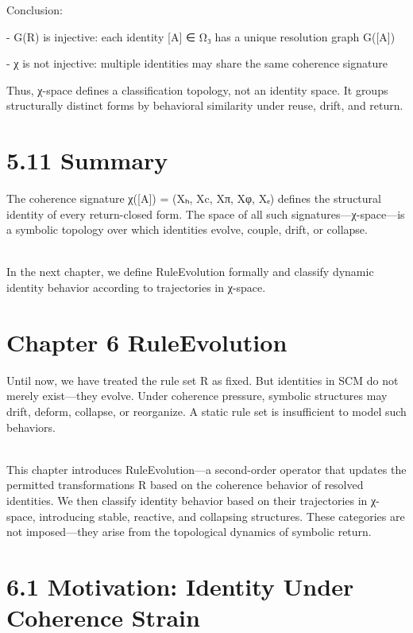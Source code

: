 Conclusion:

- G(R) is injective: each identity {[}A{]} ∈ Ω₃ has a unique resolution
graph G({[}A{]})

- χ is not injective: multiple identities may share the same coherence
signature

Thus, χ-space defines a classification topology, not an identity space.
It groups structurally distinct forms by behavioral similarity under
reuse, drift, and return.

\section{5.11 \textbar{} Summary}\label{summary-3}

The coherence signature χ({[}A{]}) = (Xₕ, Xc, Xπ, Xφ, Xₑ) defines the
structural identity of every return-closed form. The space of all such
signatures---χ-space---is a symbolic topology over which identities
evolve, couple, drift, or collapse.\\
\strut \\
In the next chapter, we define RuleEvolution formally and classify
dynamic identity behavior according to trajectories in χ-space.

\section{Chapter 6 \textbar{}
RuleEvolution}\label{chapter-6-ruleevolution}

Until now, we have treated the rule set R as fixed. But identities in
SCM do not merely exist---they evolve. Under coherence pressure,
symbolic structures may drift, deform, collapse, or reorganize. A static
rule set is insufficient to model such behaviors.\\
\strut \\
This chapter introduces RuleEvolution---a second-order operator that
updates the permitted transformations R based on the coherence behavior
of resolved identities. We then classify identity behavior based on
their trajectories in χ-space, introducing stable, reactive, and
collapsing structures. These categories are not imposed---they arise
from the topological dynamics of symbolic return.

\section{6.1 \textbar{} Motivation: Identity Under Coherence
Strain}\label{motivation-identity-under-coherence-strain}

